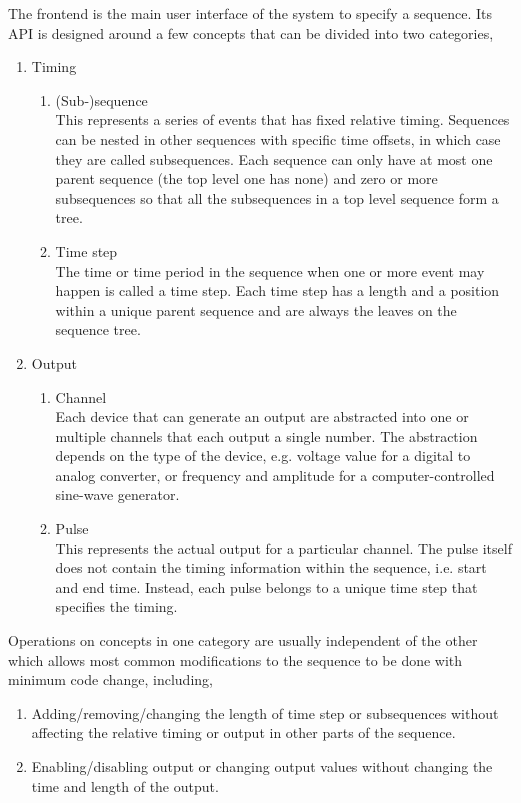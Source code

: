The frontend is the main user interface of the system to specify a sequence.
Its API is designed around a few concepts that can be divided into two categories,
\begin{enumerate}
\item Timing
  \begin{enumerate}
  \item (Sub-)sequence\\
    This represents a series of events that has fixed relative timing.
    Sequences can be nested in other sequences with specific time offsets,
    in which case they are called subsequences.
    Each sequence can only have at most one parent sequence (the top level one has none)
    and zero or more subsequences
    so that all the subsequences in a top level sequence form a tree.
  \item Time step\\
    The time or time period in the sequence when one or more event may happen
    is called a time step.
    Each time step has a length and a position within a unique parent sequence
    and are always the leaves on the sequence tree.
  \end{enumerate}
\item Output
  \begin{enumerate}
  \item Channel\\
    Each device that can generate an output are abstracted into
    one or multiple channels that each output a single number.
    The abstraction depends on the type of the device,
    e.g. voltage value for a digital to analog converter,
    or frequency and amplitude for a computer-controlled sine-wave generator.
  \item Pulse\\
    This represents the actual output for a particular channel.
    The pulse itself does not contain the timing information within the sequence,
    i.e. start and end time.
    Instead, each pulse belongs to a unique time step that specifies the timing.
  \end{enumerate}
\end{enumerate}
Operations on concepts in one category are usually independent of the other
which allows most common modifications to the sequence to be done
with minimum code change, including,
\begin{enumerate}
\item Adding/removing/changing the length of time step or subsequences
  without affecting the relative timing or output in other parts of the sequence.
\item Enabling/disabling output or changing output values
  without changing the time and length of the output.
\end{enumerate}

